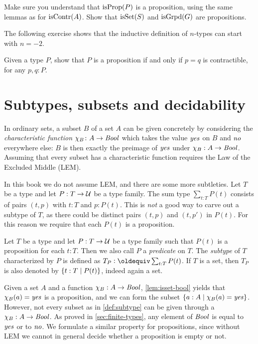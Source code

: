\begin{xca}\label{xca:isX-is-prop}
Make sure you understand that $\mathrm{isProp}(P)$ is a proposition,
using the same lemmas as for $\mathrm{isContr}(A)$.
Show that $\mathrm{isSet}(S)$ and $\mathrm{isGrpd}(G)$ are propositions.
\end{xca}

The following exercise shows that the inductive definition of $n$-types can start with $n=-2$.

\begin{xca}
  Given a type $P$, show that $P$ is a proposition if and only if $p=q$ is contractible, for any $p, q: P$.
\end{xca}

\section{Subtypes, subsets and decidability}
\label{sec:subtype}

In ordinary sets, a subset $B$ of a set $A$ can be given concretely by 
considering the \emph{characteristic function} $\chi_B\colon A\to\mathop{\mathit{Bool}}$ 
which takes the value $\mathop{\mathit{yes}}$ on $B$ and $\mathop{\mathit{no}}$ everywhere else: 
$B$ is then exactly the preimage of $\mathop{\mathit{yes}}$ under $\chi_B: A\to\mathop{\mathit{Bool}}$.
Assuming that every subset has a characteristic function
requires the Law of the Excluded Middle (LEM).

In this book we do not assume LEM, and there are some more subtleties. 
Let $T$ be a type and let $P: T\to\mathcal{U}$ be a type family.
The sum type $\sum_{t:T} P(t)$ consists of pairs $(t,p)$ with
$t:T$ and $p:P(t)$. This is \emph{not} a good way to carve out a subtype
of $T$, as there could be distinct pairs $(t,p)$ and $(t,p')$ in $P(t)$.
For this reason we require that each $P(t)$ is a proposition.

\begin{definition}\label{def:subtype}
Let $T$ be a type and let $P: T\to\mathcal{U}$ be a type family such that
$P(t)$ is a proposition for each $t:T$. Then we also
call $P$ a \emph{predicate} on $T$.
The \emph{subtype} of $T$ characterized by $P$ is defined 
as $T_P\defeq \sum_{t:T} P(t)$.
If $T$ is a set, then $T_P$
is also denoted by $\{t:T \mid P(t)\}$, indeed again a set.
\end{definition}

Given a set $A$ and a function $\chi_B: A\to\mathop{\mathit{Bool}}$,
\cref{lem:isset-bool} yields that $\chi_B(a) = \mathop{\mathit{yes}}$ is a
proposition, and we can form
the subset $\{a:A \mid \chi_B(a) = \mathop{\mathit{yes}}\}$. However,
not every subset as in \cref{def:subtype} can be given
through a $\chi_B: A\to\mathop{\mathit{Bool}}$. As proved in \cref{sec:finite-types},
any element of $\mathop{\mathit{Bool}}$ is equal to $\mathop{\mathit{yes}}$ or to $\mathop{\mathit{no}}$.
We formulate a similar property for propositions, since without LEM
we cannot in general decide whether a proposition is empty or not.

